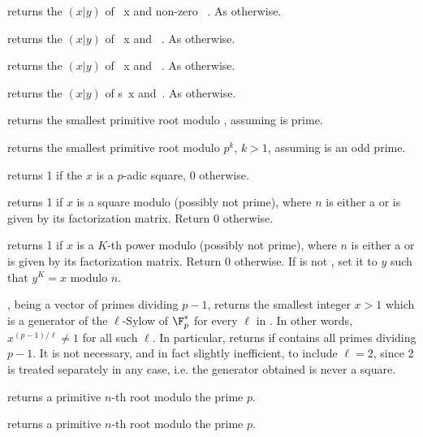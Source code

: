  returns the  $(x|y)$
of ~x and non-zero ~. As  otherwise.

 returns the  $(x|y)$
of ~x and ~. As  otherwise.

 returns the  $(x|y)$
of ~x and ~. As  otherwise.

 returns the  $(x|y)$
of s~x and~. As  otherwise.

 returns the smallest primitive root modulo
, assuming  is prime.

 returns the smallest primitive root modulo $p^k$,
$k > 1$, assuming  is an odd prime.

 returns 1 if the  $x$ is
a $p$-adic square, $0$ otherwise.

 returns 1 if  $x$ is
a square modulo  (possibly not prime), where $n$ is either a 
or is given by its factorization matrix. Return $0$ otherwise.

 returns 1 if 
$x$ is a $K$-th power modulo  (possibly not prime), where $n$ is
either a  or is given by its factorization matrix. Return $0$
otherwise. If  is not , set it to $y$ such that $y^K = x$
modulo $n$.

,  being a vector of
primes dividing $p - 1$, returns the smallest integer $x > 1$ which is a
generator of the $\ell$-Sylow of $\F_p^*$ for every $\ell$ in . In
other words, $x^{(p-1)/\ell} \neq 1$ for all such $\ell$. In particular,
returns  if  contains all primes dividing $p - 1$.
It is not necessary, and in fact slightly inefficient, to include $\ell=2$,
since 2 is treated separately in any case, i.e. the generator obtained is
never a square.

 returns a primitive $n$-th root modulo
the prime $p$.

 returns a primitive $n$-th root modulo
the prime $p$.

